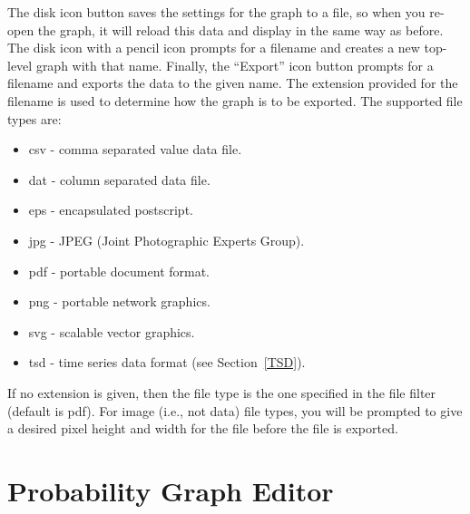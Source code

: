 \documentclass[titlepage,11pt]{article}
\begin{document}
The disk icon button saves the settings for the graph to 
a file, so when you re-open the graph, it will reload this data and display 
in the same way as before.  The disk icon with a pencil icon prompts for a 
filename and creates a new top-level graph with that name.  
Finally, the ``Export'' icon button prompts for a filename and exports
the data to the given name.  The extension provided for the filename 
is used to determine how the graph is to be exported. The
supported file types are: 
\begin{itemize}
\item csv - comma separated value data file. 
\item dat - column separated data file. 
\item eps - encapsulated postscript. 
\item jpg - JPEG (Joint Photographic Experts Group). 
\item pdf - portable document format.
\item png - portable network graphics. 
\item svg - scalable vector graphics.
\item tsd - time series data format (see Section~\ref{TSD}).
\end{itemize}
If no extension is given, then the file type is the one
specified in the file filter (default is pdf).  For image (i.e.,
not data) file types, you will be prompted to give a desired
pixel height and width for the file before the file is exported. 

\clearpage

\section{\label{ProbEdit}Probability Graph Editor}
\end{document}
